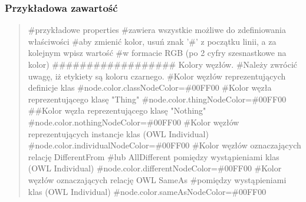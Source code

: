 \subsubsection{Przykładowa zawartość}
\begin{quote}

\#przykładowe properties \newline
\#zawiera wszystkie możliwe do zdefiniowania właściwości \newline
\#aby zmienić kolor, usuń znak '\#' z początku linii, a za kolejnym wpisz wartość \newline
\#w formacie RGB (po 2 cyfry szesnastkowe na kolor) \newline
 \newline
\#\#\#\#\#\#\#\#\#\#\#\#\#\#\#\#\#\# Kolory węzłów. \newline
\#Należy zwrócić uwagę, iż etykiety są koloru czarnego. \newline
 \newline
\#Kolor węzłów reprezentujących definicje klas \newline
\#node.color.classNodeColor=\#00FF00 \newline
 \newline
\#Kolor węzła reprezentującego klasę "Thing" \newline
\#node.color.thingNodeColor=\#00FF00 \newline
 \newline
\#\#Kolor węzła reprezentującego klasę "Nothing" \newline
\#node.color.nothingNodeColor=\#00FF00 \newline
 \newline
\#Kolor węzłów reprezentujących instancje klas (OWL Individual) \newline
\#node.color.individualNodeColor=\#00FF00 \newline
 \newline
\#Kolor węzłów oznaczających relację DifferentFrom \newline
\#lub AllDifferent pomiędzy wystąpieniami klas (OWL Individual) \newline
\#node.color.differentNodeColor=\#00FF00 \newline
 \newline
\#Kolor węzłów oznaczających relację OWL SameAs \newline
\#pomiędzy wystąpieniami klas (OWL Individual) \newline
\#node.color.sameAsNodeColor=\#00FF00 \newline
 \newline

\end{quote}
